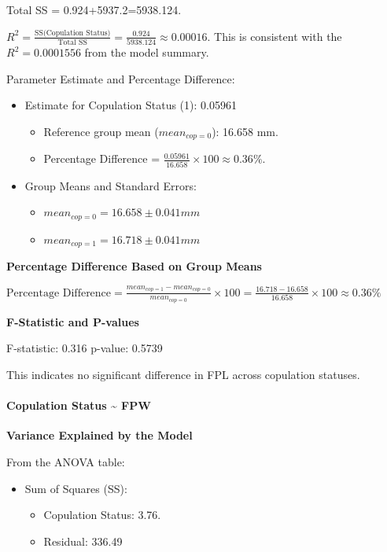 \documentclass[
]{article}
\providecommand{\tightlist}{%
  \setlength{\itemsep}{0pt}\setlength{\parskip}{0pt}}
\begin{document}
Total SS = 0.924+5937.2=5938.124.

\(R^2 = \frac{\text{SS(Copulation Status)}}{\text{Total SS}} = \frac{0.924}{5938.124} \approx 0.00016\).
This is consistent with the \(R^2 = 0.0001556\) from the model summary.

Parameter Estimate and Percentage Difference:

\begin{itemize}
\item
  Estimate for Copulation Status (1): 0.05961

  \begin{itemize}
  \tightlist
  \item
    Reference group mean (\(mean_{cop=0}\)): 16.658 mm.
  \item
    Percentage Difference =
    \(\frac{0.05961}{16.658} \times 100 \approx 0.36 \%\).
  \end{itemize}
\item
  Group Means and Standard Errors:

  \begin{itemize}
  \tightlist
  \item
    \(mean_{cop=0} = 16.658 \pm 0.041mm\)
  \item
    \(mean_{cop=1} = 16.718 \pm 0.041mm\)
  \end{itemize}
\end{itemize}

\textbf{Percentage Difference Based on Group Means}

\(\text{Percentage Difference} = \frac{mean_{cop=1}-mean_{cop=0}}{mean_{cop=0}}\times100 = \frac{16.718-16.658}{16.658}\times100 \approx 0.36 \%\)

\textbf{F-Statistic and P-values}

F-statistic: 0.316 p-value: 0.5739

This indicates no significant difference in FPL across copulation
statuses.

\hypertarget{copulation-status-fpw}{%
\paragraph{Copulation Status \textasciitilde{}
FPW}\label{copulation-status-fpw}}

\textbf{Variance Explained by the Model}

From the ANOVA table:

\begin{itemize}
\item
  Sum of Squares (SS):

  \begin{itemize}
  \tightlist
  \item
    Copulation Status: 3.76.
  \item
    Residual: 336.49
  \end{itemize}
\end{itemize}
\end{document}
